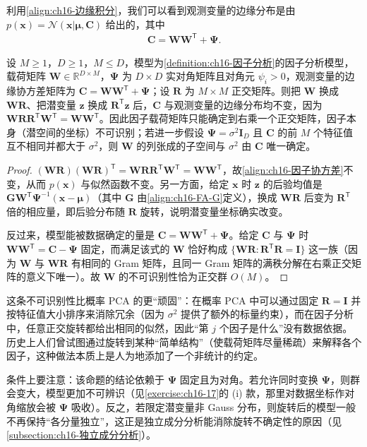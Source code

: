 \documentclass[../../main.tex]{subfiles}
\begin{document}
利用\eqref{align:ch16-边缘积分}，我们可以看到观测变量的边缘分布是由 $p(\bm{x})=\mathcal{N}(\bm{x}|\bm{\mu},\bm{C})$ 给出的，其中
\begin{align}
  \bm{C}=\bm{W}\bm{W}^{\mathsf T}+\bm{\Psi}.
  \label{align:ch16-因子协方差}
\end{align}

\begin{proposition}[因子分析的旋转不变性]\label{proposition:ch16-因子分析旋转不变}
设 $M\geqslant1$，$D\geqslant1$，$M\leqslant D$，模型为\cref{definition:ch16-因子分析}的因子分析模型，载荷矩阵 $\bm{W}\in\mathbb{R}^{D\times M}$，$\bm{\Psi}$ 为 $D\times D$ 实对角矩阵且对角元 $\psi_i>0$，观测变量的边缘协方差矩阵为 $\bm{C}=\bm{W}\bm{W}^{\mathsf T}+\bm{\Psi}$；设 $\bm{R}$ 为 $M\times M$ 正交矩阵。则把 $\bm{W}$ 换成 $\bm{W}\bm{R}$、把潜变量 $\bm{z}$ 换成 $\bm{R}^{\mathsf T}\bm{z}$ 后，$\bm{C}$ 与观测变量的边缘分布均不变，因为 $\bm{W}\bm{R}\bm{R}^{\mathsf T}\bm{W}^{\mathsf T}=\bm{W}\bm{W}^{\mathsf T}$。因此因子载荷矩阵只能确定到右乘一个正交矩阵，因子本身（潜空间的坐标）不可识别；若进一步假设 $\bm{\Psi}=\sigma^2\bm{I}_D$ 且 $\bm{C}$ 的前 $M$ 个特征值互不相同并都大于 $\sigma^2$，则 $\bm{W}$ 的列张成的子空间与 $\sigma^2$ 由 $\bm{C}$ 唯一确定。
\end{proposition}

\begin{proof}
$(\bm{W}\bm{R})(\bm{W}\bm{R})^{\mathsf T}=\bm{W}\bm{R}\bm{R}^{\mathsf T}\bm{W}^{\mathsf T}=\bm{W}\bm{W}^{\mathsf T}$，故\eqref{align:ch16-因子协方差}不变，从而 $p(\bm{x})$ 与似然函数不变。另一方面，给定 $\bm{x}$ 时 $\bm{z}$ 的后验均值是 $\bm{G}\bm{W}^{\mathsf T}\bm{\Psi}^{-1}(\bm{x}-\bm{\mu})$（其中 $\bm{G}$ 由\eqref{align:ch16-FA-G}定义），换成 $\bm{W}\bm{R}$ 后变为 $\bm{R}^{\mathsf T}$ 倍的相应量，即后验分布随 $\bm{R}$ 旋转，说明潜变量坐标确实改变。

反过来，模型能被数据确定的量是 $\bm{C}=\bm{W}\bm{W}^{\mathsf T}+\bm{\Psi}$。给定 $\bm{C}$ 与 $\bm{\Psi}$ 时 $\bm{W}\bm{W}^{\mathsf T}=\bm{C}-\bm{\Psi}$ 固定，而满足该式的 $\bm{W}$ 恰好构成 $\{\bm{W}\bm{R}:\bm{R}^{\mathsf T}\bm{R}=\bm{I}\}$ 这一族（因为 $\bm{W}$ 与 $\bm{W}\bm{R}$ 有相同的 Gram 矩阵，且同一 Gram 矩阵的满秩分解在右乘正交矩阵的意义下唯一）。故 $\bm{W}$ 的不可识别性恰为正交群 $O(M)$。
\end{proof}

\begin{remark}
这条不可识别性比概率 PCA 的更“顽固”：在概率 PCA 中可以通过固定 $\bm{R}=\bm{I}$ 并按特征值大小排序来消除冗余（因为 $\sigma^2$ 提供了额外的标量约束），而在因子分析中，任意正交旋转都给出相同的似然，因此“第 $j$ 个因子是什么”没有数据依据。历史上人们曾试图通过旋转到某种“简单结构”（使载荷矩阵尽量稀疏）来解释各个因子，这种做法本质上是人为地添加了一个非统计的约定。

条件上要注意：该命题的结论依赖于 $\bm{\Psi}$ 固定且为对角。若允许同时变换 $\bm{\Psi}$，则群会变大，模型更加不可辨识（见\cref{exercise:ch16-17}的 (i) 款，那里对数据坐标作对角缩放会被 $\bm{\Psi}$ 吸收）。反之，若限定潜变量非 Gauss 分布，则旋转后的模型一般不再保持“各分量独立”，这正是独立成分分析能消除旋转不确定性的原因（见\cref{subsection:ch16-独立成分分析}）。
\end{remark}
\end{document}
